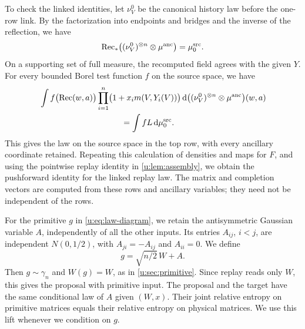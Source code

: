 To check the linked identities, let $\nu_V^0$ be the canonical
history law before the one-row link. By the factorization into
endpoints and bridges and the inverse of the reflection, we have
\[
 \operatorname{Rec}_*\bigl((\nu_V^0)^{\otimes n}
                          \otimes\mu^{\rm anc}\bigr)
       =\mu^{\rm src}_0.
\]
On a supporting set of full measure, the recomputed field agrees with
the given $Y$. For every bounded Borel test function $f$ on the source space, we have
\[
 \begin{aligned}
 &\int f\bigl(\operatorname{Rec}(w,a)\bigr)
      \prod_{i=1}^n\bigl(1+x_i m(V,Y_i(V))\bigr)
      \dd\bigl((\nu_V^0)^{\otimes n}\otimes\mu^{\rm anc}\bigr)(w,a)\\
 &\hspace{35mm}=\int fL\dd\mu^{\rm src}_0.
 \end{aligned}
\]
This gives the law on the source space in the top row, with every
ancillary coordinate retained. Repeating this calculation of densities and maps for $F$,
and using the pointwise replay identity in \cref{u:lem:assembly}, we obtain the
pushforward identity for the linked replay law. The matrix and completion vectors are computed
from these rows and ancillary variables; they need not be independent
of the rows.

For the primitive $g$ in \eqref{u:eq:law-diagram}, we retain the
antisymmetric Gaussian variable $A$, independently of all the other
inputs.
Its entries $A_{ij}$, $i<j$, are independent $N(0,1/2)$, with
$A_{ji}=-A_{ij}$ and $A_{ii}=0$. We define
\[
 g=\sqrt{n/2}\,W+A.
\]
Then $g\sim\gamma_n$ and $W(g)=W$, as in \cref{u:sec:primitive}.
Since replay reads only $W$, this gives the proposal with primitive input.
The proposal and the target have the same conditional law of $A$ given
$(W,x)$. Their joint relative entropy on primitive matrices equals
their relative entropy on physical matrices. We use this lift whenever
we condition on $g$.

